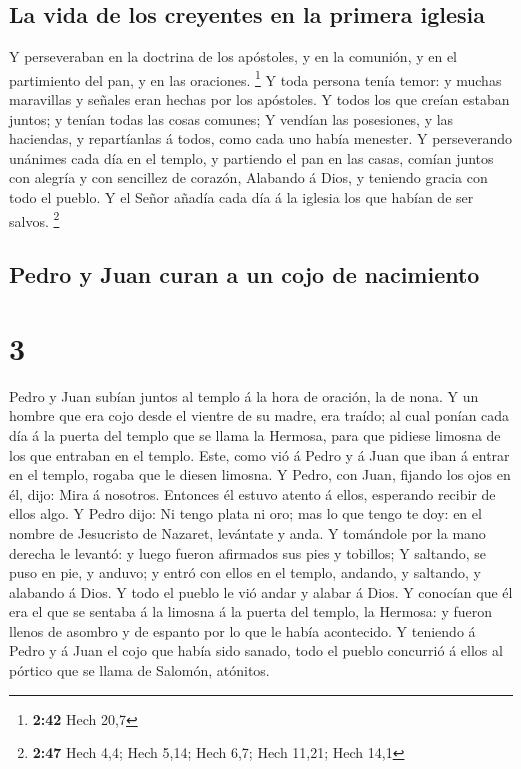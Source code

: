 \hypertarget{la-vida-de-los-creyentes-en-la-primera-iglesia}{%
\subsection{La vida de los creyentes en la primera
iglesia}\label{la-vida-de-los-creyentes-en-la-primera-iglesia}}

 Y perseveraban en la doctrina de los apóstoles, y en la
comunión, y en el partimiento del pan, y en las oraciones. \footnote{\textbf{2:42}
  Hech 20,7}  Y toda persona tenía temor: y muchas
maravillas y señales eran hechas por los apóstoles.  Y
todos los que creían estaban juntos; y tenían todas las cosas comunes;
 Y vendían las posesiones, y las haciendas, y repartíanlas
á todos, como cada uno había menester.  Y perseverando
unánimes cada día en el templo, y partiendo el pan en las casas, comían
juntos con alegría y con sencillez de corazón,  Alabando á
Dios, y teniendo gracia con todo el pueblo. Y el Señor añadía cada día á
la iglesia los que habían de ser salvos. \footnote{\textbf{2:47} Hech
  4,4; Hech 5,14; Hech 6,7; Hech 11,21; Hech 14,1}

\hypertarget{pedro-y-juan-curan-a-un-cojo-de-nacimiento}{%
\subsection{Pedro y Juan curan a un cojo de
nacimiento}\label{pedro-y-juan-curan-a-un-cojo-de-nacimiento}}

\hypertarget{section-2}{%
\section{3}\label{section-2}}

 Pedro y Juan subían juntos al templo á la hora de oración,
la de nona.  Y un hombre que era cojo desde el vientre de su
madre, era traído; al cual ponían cada día á la puerta del templo que se
llama la Hermosa, para que pidiese limosna de los que entraban en el
templo.  Este, como vió á Pedro y á Juan que iban á entrar
en el templo, rogaba que le diesen limosna.  Y Pedro, con
Juan, fijando los ojos en él, dijo: Mira á nosotros. 
Entonces él estuvo atento á ellos, esperando recibir de ellos algo.
 Y Pedro dijo: Ni tengo plata ni oro; mas lo que tengo te
doy: en el nombre de Jesucristo de Nazaret, levántate y anda.
 Y tomándole por la mano derecha le levantó: y luego fueron
afirmados sus pies y tobillos;  Y saltando, se puso en pie,
y anduvo; y entró con ellos en el templo, andando, y saltando, y
alabando á Dios.  Y todo el pueblo le vió andar y alabar á
Dios.  Y conocían que él era el que se sentaba á la limosna
á la puerta del templo, la Hermosa: y fueron llenos de asombro y de
espanto por lo que le había acontecido.  Y teniendo á Pedro
y á Juan el cojo que había sido sanado, todo el pueblo concurrió á ellos
al pórtico que se llama de Salomón, atónitos.

